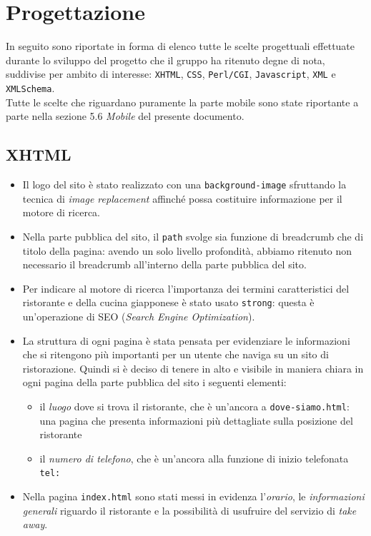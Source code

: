 \documentclass[../relazione.tex]{subfiles}
\begin{document}
\section{Progettazione}
	In seguito sono riportate in forma di elenco tutte le scelte progettuali effettuate durante lo sviluppo del progetto che il gruppo ha ritenuto degne di nota, suddivise per ambito di interesse: \texttt{XHTML}, \texttt{CSS}, \texttt{Perl/CGI}, \texttt{Javascript}, \texttt{XML} e \texttt{XMLSchema}.\\
	Tutte le scelte che riguardano puramente la parte mobile sono state riportante a parte nella sezione 5.6 \textit{Mobile} del presente documento.
	\subsection{XHTML}
	\begin{itemize}
		\item Il logo del sito è stato realizzato con una \texttt{background-image} sfruttando la tecnica di \textit{image replacement} affinché possa costituire informazione per il motore di ricerca.
		\item Nella parte pubblica del sito, il \texttt{path} svolge sia funzione di breadcrumb che di titolo della pagina: avendo un solo livello profondità, abbiamo ritenuto non necessario il breadcrumb all'interno della parte pubblica del sito.
		\item Per indicare al motore di ricerca l'importanza dei termini caratteristici del ristorante e della cucina giapponese è stato usato \texttt{strong}: questa è un'operazione di SEO (\textit{Search Engine Optimization}).
		\item La struttura di ogni pagina è stata pensata per evidenziare le informazioni che si ritengono più importanti per un utente che naviga su un sito di ristorazione. Quindi si è deciso di tenere in alto e visibile in maniera chiara in ogni pagina della parte pubblica del sito i seguenti elementi:
		\begin{itemize}
			\item il \textit{luogo} dove si trova il ristorante, che è un'ancora a \texttt{dove-siamo.html}: una pagina che presenta informazioni più dettagliate sulla posizione del ristorante
			\item il \textit{numero di telefono}, che è un'ancora alla funzione di inizio telefonata \texttt{tel:}
		\end{itemize}
		\item Nella pagina \texttt{index.html} sono stati messi in evidenza l'\textit{orario}, le \textit{informazioni generali} riguardo il ristorante e la possibilità di usufruire del servizio di \textit{take away}.

\end{itemize}
\end{document}
